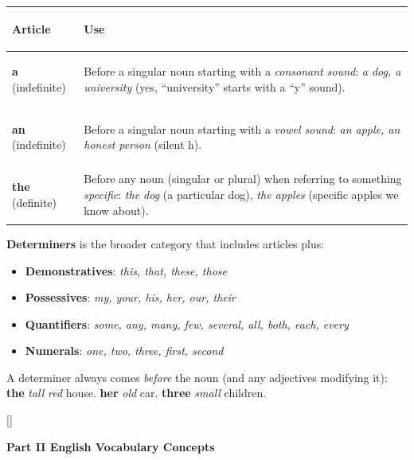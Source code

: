 \documentclass[11pt, letterpaper]{article}
\newcommand{\greensections}{%
  \titleformat{\section}{\large\bfseries\color{sectiongreen}}{}{0em}{}[\color{sectiongreen}\titlerule]%
  \titleformat{\subsection}{\normalsize\bfseries\color{sectiongreen!80!black}}{}{0em}{}%
}
\newcommand{\partbanner}[3]{%
  \begin{tcolorbox}[colback=#1, colframe=#2, boxrule=1.2pt, arc=4pt,
    left=8pt, right=8pt, top=6pt, bottom=6pt]
    \begin{center}{\LARGE\bfseries #3}\end{center}
  \end{tcolorbox}%
}
\begin{document}
\noindent
{\renewcommand{\arraystretch}{1.5}
\begin{tabularx}{\textwidth}{>{\bfseries\raggedright\arraybackslash}p{3cm}
                              >{\raggedright\arraybackslash}X}
\toprule
\rowcolor{tableheader}
\textbf{Article} & \textbf{Use} \\
\midrule
\rowcolor{rowA}  \textbf{a} (indefinite)  & Before a singular noun starting with a \emph{consonant sound}: \emph{a dog, a university} (yes, ``university'' starts with a ``y'' sound). \\
\rowcolor{rowB}  \textbf{an} (indefinite) & Before a singular noun starting with a \emph{vowel sound}: \emph{an apple, an honest person} (silent h). \\
\rowcolor{rowA}  \textbf{the} (definite)  & Before any noun (singular or plural) when referring to something \emph{specific}: \emph{the dog} (a particular dog), \emph{the apples} (specific apples we know about). \\
\bottomrule
\end{tabularx}}

\textbf{Determiners} is the broader category that includes articles plus:
\begin{itemize}[noitemsep]
  \item \textbf{Demonstratives}: \emph{this, that, these, those}
  \item \textbf{Possessives}: \emph{my, your, his, her, our, their}
  \item \textbf{Quantifiers}: \emph{some, any, many, few, several, all, both, each, every}
  \item \textbf{Numerals}: \emph{one, two, three, first, second}
\end{itemize}

A determiner always comes \emph{before} the noun (and any adjectives modifying it):
\textbf{the} \emph{tall} \emph{red} house. \quad \textbf{her} \emph{old} car. \quad
\textbf{three} \emph{small} children.

\newpage

\greensections
{}
\partbanner{part2bg}{sectiongreen}{Part II \quad English Vocabulary Concepts}
\end{document}
